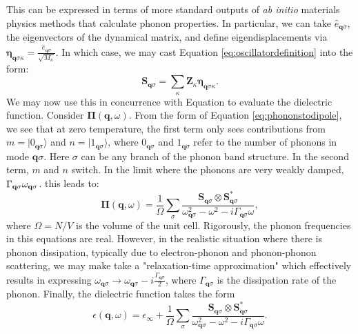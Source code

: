 \documentclass[aps,prb,twocolumn,
	groupedaddress,superscriptaddress,
	amsfonts,amssymb,amsmath,floatfix,
	citeautoscript]{revtex4-1}
\begin{document}
This can be expressed in terms of more standard outputs of \emph{ab initio} materials physics methods that calculate phonon properties. In particular, we can take $\hat{e}_{\mathbf{q}\sigma}$, the eigenvectors of the dynamical matrix, and define eigendisplacements via $\boldsymbol{\eta}_{\mathbf{q}\sigma\kappa}=\frac{\hat{e}_{\mathbf{q}\sigma}}{\sqrt{M_{\kappa}}}$. In which case, we may cast Equation \ref{eq:oscillatordefinition} into the form:
\begin{equation}\label{eq:oscillatorstrength}
\mathbf{S}_{\mathbf{q}\sigma} = \sum\limits_{\kappa} \mathbf{Z}_{\kappa}\boldsymbol{\eta}_{\mathbf{q}\sigma\kappa}.
\end{equation}
We may now use this in concurrence with Equation \cite{eq:polarizationkubo} to evaluate the dielectric function. Consider $\boldsymbol{\Pi}(\mathbf{q},\omega)$. From the form of Equation \ref{eq:phononstodipole}, we see that at zero temperature, the first term only sees contributions from $m=|0_{\mathbf{q}\sigma}\rangle$ and $n=|1_{\mathbf{q}\sigma}\rangle$, where $0_{\mathbf{q}\sigma}$ and $1_{\mathbf{q}\sigma}$ refer to the number of phonons in mode $\mathbf{q}\sigma$. Here $\sigma$ can be any branch of the phonon band structure. In the second term, $m$ and $n$ switch. In the limit where the phonons are very weakly damped, $\Gamma_{\mathbf{q}\sigma} \\ \omega_{\mathbf{q}\sigma}$. this leads to:
\begin{equation}\label{eq:fullsusceptibility}
\boldsymbol{\Pi}(\mathbf{q},\omega) = \frac{1}{\Omega}\sum\limits_{\sigma}\frac{\mathbf{S}_{\mathbf{q}\sigma}\otimes \mathbf{S}_{\mathbf{q}\sigma}^*}{\omega^2_{\mathbf{q}\sigma}-\omega^2-i\Gamma_{\mathbf{q}\sigma}\omega},
\end{equation}
where $\Omega=N/V$ is the volume of the unit cell. Rigorously, the phonon frequencies in this equations are real. However, in the realistic situation where there is phonon dissipation, typically due to electron-phonon and phonon-phonon scattering, we may make take a "relaxation-time approximation" which effectively results in expressing $\omega_{\mathbf{q}\sigma} \rightarrow \omega_{\mathbf{q}\sigma} - i\frac{\Gamma_{\mathbf{q}\sigma}}{2}$, where $\Gamma_{\mathbf{q}\sigma}$ is the dissipation rate of the phonon. Finally, the dielectric function takes the form
\begin{equation}\label{eq:pitoepsilon}
\epsilon(\mathbf{q},\omega) = \epsilon_{\infty} + \frac{1}{\Omega}\sum\limits_{\sigma}\frac{\mathbf{S}_{\mathbf{q}\sigma}\otimes \mathbf{S}_{\mathbf{q}\sigma}^*}{\omega^2_{\mathbf{q}\sigma}-\omega^2-i\Gamma_{\mathbf{q}\sigma}\omega}.
\end{equation}
\end{document}
